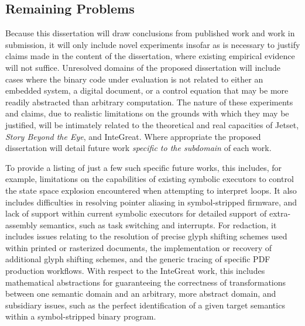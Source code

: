 \subsection{Remaining Problems}

Because this dissertation will draw conclusions from published work and work in submission, it will only include novel experiments insofar as is necessary to justify claims made in the content of the dissertation, where existing empirical evidence will not suffice.
Unresolved domains of the proposed dissertation will include cases where the binary code under evaluation is not related to either an embedded system, a digital document, or a control equation that may be more readily abstracted than arbitrary computation.
The nature of these experiments and claims, due to realistic limitations on the grounds with which they may be justified, will be intimately related to the theoretical and real capacities of Jetset, \emph{Story Beyond the Eye}, and InteGreat.
Where appropriate the proposed dissertation will detail future work \emph{specific to the subdomain} of each work.

To provide a listing of just a few such specific future works, this includes, for example, limitations on the capabilities of existing symbolic executors to control the state space explosion encountered when attempting to interpret loops. 
It also includes difficulties in resolving pointer aliasing in symbol-stripped firmware, and lack of support within current symbolic executors for detailed support of extra-assembly semantics, such as task switching and interrupts. 
For redaction, it includes issues relating to the resolution of precise glyph shifting schemes used within printed or rasterized documents, the implementation or recovery of additional glyph shifting schemes, and the generic tracing of specific PDF production workflows.
With respect to the InteGreat work, this includes mathematical abstractions for guaranteeing the correctness of transformations between one semantic domain and an arbitrary, more abstract domain, and subsidiary issues, such as the perfect identification of a given target semantics within a symbol-stripped binary program.
